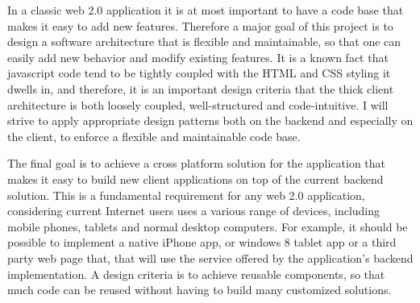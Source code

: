 	In a classic web 2.0 application it is at most
                important to have a code base that makes
                it easy to add new features. Therefore a major goal of
                this project is to design a software architecture that
                is flexible and maintainable, so that one can easily add new behavior
                and modify existing features. It is a known fact that
                javascript code tend to be tightly coupled with the
                HTML and CSS styling it dwells in, and therefore, it is an important
        design criteria that the thick client architecture is both
        loosely coupled, well-structured and code-intuitive. I will strive to
        apply appropriate design patterns both on the backend and
        especially on the client, to enforce a flexible and
        maintainable code base.  

The final goal is to achieve a cross platform solution for the
        application that makes it easy to build new client
        applications on top of the current backend solution. This is a
        fundamental requirement for any web 2.0 application,
        considering current Internet users uses a various range of
        devices, including mobile phones, tablets and normal desktop
        computers. For example, it should be possible to implement a
        native iPhone app, or windows 8 tablet app or a third party
        web page that, that will use the service offered by the
        application's backend implementation. A design criteria is to
        achieve reusable components, so that much code can be reused
        without having to build many customized solutions.

